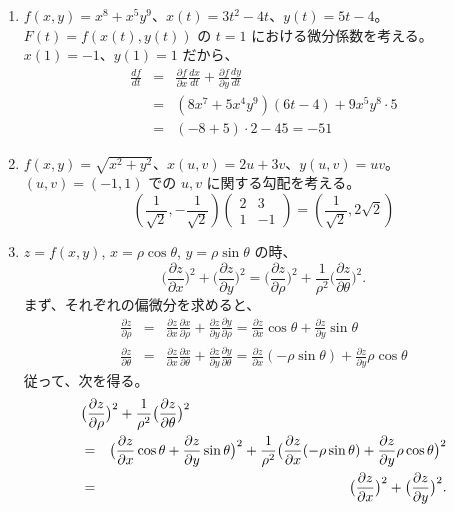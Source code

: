 \begin{eg}
\begin{enumerate}
\item $f(x,y) = x^8 + x^5y^9$、$x(t) = 3t^2 - 4t$、$y(t) = 5t - 4$。$F(t) = f(x(t),y(t))$ の $t = 1$ における微分係数を考える。$x(1) = -1$、$y(1) = 1$ だから、
\begin{eqnarray*}
\frac{df}{dt} & = & \frac{\partial f}{\partial x}\frac{dx}{dt} + \frac{\partial f}{\partial y}\frac{dy}{dt}\\
& = & (8x^7 + 5x^4y^9)(6t-4) + 9x^5y^8\cdot 5\\
& = & (-8+5)\cdot 2 - 45 = -51
\end{eqnarray*}
\item $f(x,y) = \sqrt{x^2 + y^2}$、$x(u,v) = 2u+3v$、$y(u,v) = uv$。$(u,v) = (-1,1)$ での $u,v$ に関する勾配を考える。
$$(\frac{1}{\sqrt{2}},-\frac{1}{\sqrt{2}})\left(\begin{array}{cc}2 & 3\\1 & -1\end{array}\right) = (\frac{1}{\sqrt{2}},2\sqrt{2})$$
\item $z = f(x,y)$, $x = \rho\cos\theta$, $y = \rho\sin\theta$ の時、
$$\bigl(\frac{\partial z}{\partial x}\bigr)^2 + \bigl(\frac{\partial z}{\partial y}\bigr)^2 = \bigl(\frac{\partial z}{\partial \rho}\bigr)^2 + \frac{1}{\rho^2}\bigl(\frac{\partial z}{\partial \theta}\bigr)^2.$$
まず、それぞれの偏微分を求めると、
\begin{eqnarray*}
\frac{\partial z}{\partial\rho} & = & \frac{\partial z}{\partial x}\frac{\partial x}{\partial\rho} + \frac{\partial z}{\partial y}\frac{\partial y}{\partial\rho} = \frac{\partial z}{\partial x}\cos\theta + \frac{\partial z}{\partial y}\sin\theta\\
\frac{\partial z}{\partial\theta} & = & \frac{\partial z}{\partial x}\frac{\partial x}{\partial\theta} + \frac{\partial z}{\partial y}\frac{\partial y}{\partial\theta} = \frac{\partial z}{\partial x}(-\rho\sin\theta) + \frac{\partial z}{\partial y}\rho\cos\theta
\end{eqnarray*}
従って、次を得る。
\begin{eqnarray*}
\lefteqn{\bigl(\frac{\partial z}{\partial \rho}\bigr)^2 + \frac{1}{\rho^2}\bigl(\frac{\partial z}{\partial \theta}\bigr)^2}\\
& = &\bigl(\frac{\partial z}{\partial x}\cos\theta + \frac{\partial z}{\partial y}\sin\theta\bigr)^2 + \frac{1}{\rho^2}\bigl(\frac{\partial z}{\partial x}(-\rho\sin\theta) + \frac{\partial z}{\partial y}\rho\cos\theta\bigr)^2\\
& = & \bigl(\frac{\partial z}{\partial x}\bigr)^2 + \bigl(\frac{\partial z}{\partial y}\bigr)^2.
\end{eqnarray*}
\end{enumerate}
\end{eg}

